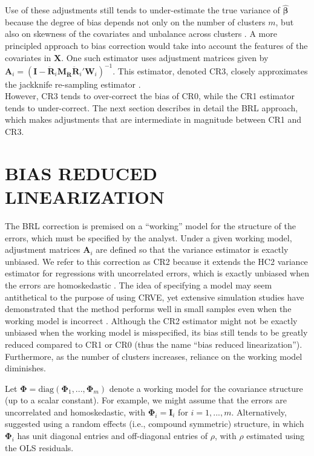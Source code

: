 \documentclass[12pt]{article}
\begin{document}
Use of these adjustments still tends to under-estimate the true variance
of \(\hat{\boldsymbol\beta}\) because the degree of bias depends not
only on the number of clusters \(m\), but also on skewness of the
covariates and unbalance across clusters
\citep{Carter2013asymptotic, MacKinnon2013thirty, Cameron2015practitioners, Young2016improved}.
A more principled approach to bias correction would take into account
the features of the covariates in \(\mathbf{X}\). One such estimator
uses adjustment matrices given by
\(\mathbf{A}_i = \left(\mathbf{I} - \mathbf{\ddot{R}}_i \mathbf{M_{\ddot{R}}}\mathbf{\ddot{R}}_i'\mathbf{W}_i\right)^{-1}\).
This estimator, denoted CR3, closely approximates the jackknife
re-sampling estimator \citep{Bell2002bias, Mancl2001covariance}.\\
However, CR3 tends to over-correct the bias of CR0, while the CR1
estimator tends to under-correct. The next section describes in detail
the BRL approach, which makes adjustments that are intermediate in
magnitude between CR1 and CR3.

\hypertarget{sec:BRL}{%
\section{BIAS REDUCED LINEARIZATION}\label{sec:BRL}}

The BRL correction is premised on a ``working'' model for the structure
of the errors, which must be specified by the analyst. Under a given
working model, adjustment matrices \(\mathbf{A}_i\) are defined so that
the variance estimator is exactly unbiased. We refer to this correction
as CR2 because it extends the HC2 variance estimator for regressions
with uncorrelated errors, which is exactly unbiased when the errors are
homoskedastic \citep{MacKinnon1985some}. The idea of specifying a model
may seem antithetical to the purpose of using CRVE, yet extensive
simulation studies have demonstrated that the method performs well in
small samples even when the working model is incorrect
\citep{Tipton2015small-t, Bell2002bias, Cameron2015practitioners, Imbens2015robust}.
Although the CR2 estimator might not be exactly unbiased when the
working model is misspecified, its bias still tends to be greatly
reduced compared to CR1 or CR0 (thus the name ``bias reduced
linearization''). Furthermore, as the number of clusters increases,
reliance on the working model diminishes.

Let
\(\boldsymbol\Phi = \text{diag}\left(\boldsymbol\Phi_1,...,\boldsymbol\Phi_m\right)\)
denote a working model for the covariance structure (up to a scalar
constant). For example, we might assume that the errors are uncorrelated
and homoskedastic, with \(\boldsymbol\Phi_i = \mathbf{I}_i\) for
\(i = 1,...,m\). Alternatively, \citet{Imbens2015robust} suggested using
a random effects (i.e., compound symmetric) structure, in which
\(\boldsymbol\Phi_i\) has unit diagonal entries and off-diagonal entries
of \(\rho\), with \(\rho\) estimated using the OLS residuals.
\end{document}
